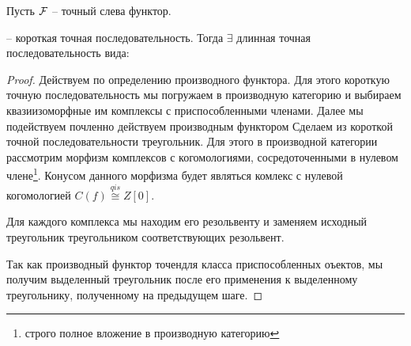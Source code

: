 \documentclass[../hw_main.tex]{subfiles}
\begin{document}
\begin{to_claim}
Пусть $\mathcal{F}$ -- точный слева функтор.  -- короткая точная последовательность. Тогда $\exists$ длинная точная последовательность вида:
\bee
{}
\eee
\end{to_claim}
\begin{proof}
Действуем по определению производного функтора. Для этого короткую точную последовательность мы погружаем в производную категорию и выбираем квазиизоморфные им комплексы с приспособленными членами. Далее мы подействуем почленно действуем производным функтором 
Сделаем из короткой точной последовательности треугольник. Для этого в производной категории рассмотрим морфизм комплексов с когомологиями, сосредоточенными в нулевом члене\footnote{строго полное вложение в производную категорию}. Конусом данного морфизма будет являться комлекс с нулевой когомологией $C(f) \overset{qis}{\cong} Z[0]$. 
\bee
{}
\eee
Для каждого комплекса мы находим его резольвенту и заменяем исходный треугольник треугольником соответствующих резольвент.
\bee
{}
\eee
Так как производный функтор точендля класса приспособленных оъектов, мы получим выделенный треугольник после его применения к выделенному треугольнику, полученному на предыдущем шаге.

\end{proof}
\end{document}
